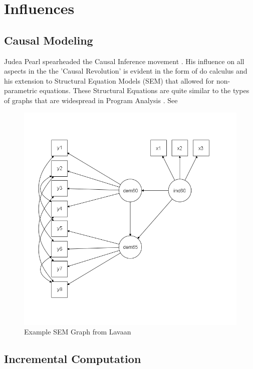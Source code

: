 \documentclass[runningheads]{llncs}
\begin{document}
\section{Influences}

\subsection{Causal Modeling}

Judea Pearl spearheaded the Causal Inference movement \cite{pearl_mackenzie_2020}. His influence on all aspects in the the 'Causal Revolution' is evident in the form of do calculus and his extension to Structural Equation Models (SEM) that allowed for non-parametric equations\cite{pearl_2008}. These Structural Equations are quite similar to the types of graphs that are widespread in Program Analysis \cite{lavaan}. See \figureautorefname

\begin{figure}
    \centering
    \includegraphics[scale=0.7]{figures/lavaanSEM.png}
    \caption{Example SEM Graph from Lavaan}
    \label{fig:Lavaan}
\end{figure}




\subsection{Incremental Computation}
\end{document}
